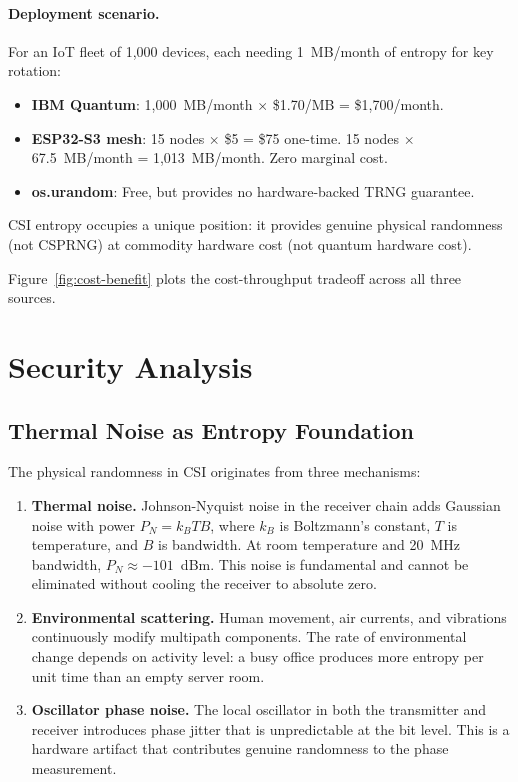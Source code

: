 \documentclass[sigconf,anonymous,review]{acmart}
\begin{document}
\paragraph{Deployment scenario.}
For an IoT fleet of 1{,}000 devices, each needing 1~MB/month of entropy for key rotation:
\begin{itemize}
\item \textbf{IBM Quantum}: 1{,}000~MB/month $\times$ \$1.70/MB = \$1{,}700/month.
\item \textbf{ESP32-S3 mesh}: 15 nodes $\times$ \$5 = \$75 one-time. 15 nodes $\times$ 67.5~MB/month = 1{,}013~MB/month. Zero marginal cost.
\item \textbf{os.urandom}: Free, but provides no hardware-backed TRNG guarantee.
\end{itemize}

CSI entropy occupies a unique position: it provides genuine physical randomness (not CSPRNG) at commodity hardware cost (not quantum hardware cost).


Figure~\ref{fig:cost-benefit} plots the cost-throughput tradeoff across all three sources.




\section{Security Analysis}
\label{sec:security}

\subsection{Thermal Noise as Entropy Foundation}
\label{subsec:thermal}

The physical randomness in CSI originates from three mechanisms:
\begin{enumerate}
\item \textbf{Thermal noise.} Johnson-Nyquist noise in the receiver chain adds Gaussian noise with power $P_N = k_B T B$, where $k_B$ is Boltzmann's constant, $T$ is temperature, and $B$ is bandwidth. At room temperature and 20~MHz bandwidth, $P_N \approx -101$~dBm. This noise is fundamental and cannot be eliminated without cooling the receiver to absolute zero.

\item \textbf{Environmental scattering.} Human movement, air currents, and vibrations continuously modify multipath components. The rate of environmental change depends on activity level: a busy office produces more entropy per unit time than an empty server room.

\item \textbf{Oscillator phase noise.} The local oscillator in both the transmitter and receiver introduces phase jitter that is unpredictable at the bit level. This is a hardware artifact that contributes genuine randomness to the phase measurement.
\end{enumerate}
\end{document}
